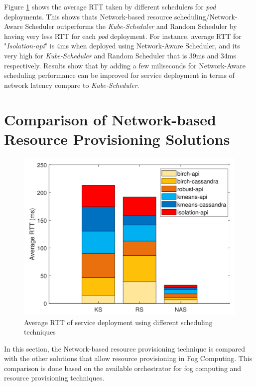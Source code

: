 Figure \ref{fig:k8s-comapre-sc} shows the average RTT taken by different schedulers for \emph{pod} deployments. This shows thats Network-based resource scheduling/Network-Aware Scheduler outperforms the \emph{Kube-Scheduler} and Random Scheduler by having very less RTT for each \emph{pod} deployment\cite{Santos2019}. For instance, average RTT for "\emph{Isolation-api}" is 4ms when deployed using Network-Aware Scheduler, and its very high for \emph{Kube-Scheduler} and Random Scheduler that is 39ms and 34ms respectively\cite{Santos2019}. Results show that by adding a few miliseconds for Network-Aware scheduling performance can be improved for service deployment in terms of network latency compare to \emph{Kube-Scheduler}\cite{Santos2019}.
\vspace{-0.5cm}
\section{Comparison of Network-based Resource Provisioning Solutions}
\label{sec:related_work}
\begin{figure}
  \centering
  \includegraphics[width=\linewidth]{figures/mlcn-k8s-scheduler-compare.pdf}
  \caption{Average RTT of service deployment using different scheduling techniques\cite{Santos2019}}
  \label{fig:k8s-comapre-sc}
\end{figure}
In this section, the Network-based resource provisioning technique is compared with the other solutions that allow resource provisioning in Fog Computing. This comparison is done based on the available orchestrator for fog computing and resource provisioning techniques.
